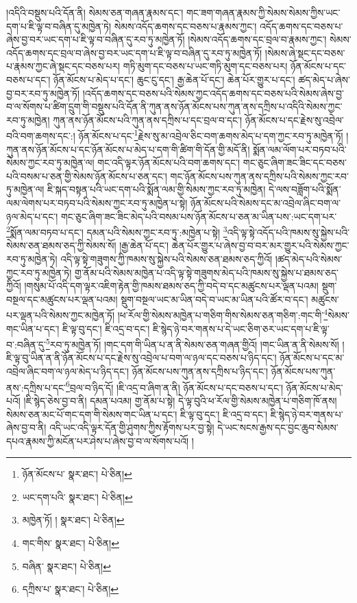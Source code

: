 །འདིའི་བསྡུས་པའི་དོན་ནི། སེམས་ཅན་གཞན་རྣམས་དང་། གང་ཟག་གཞན་རྣམས་ཀྱི་སེམས་སེམས་ཀྱིས་ཡང་དག་པ་ཇི་ལྟ་བ་བཞིན་དུ་མཁྱེན་ཏེ། སེམས་འདོད་ཆགས་དང་བཅས་པ་རྣམས་ཀྱང་། འདོད་ཆགས་དང་བཅས་པ་ཞེས་བྱ་བར་ཡང་དག་པ་ཇི་ལྟ་བ་བཞིན་དུ་རབ་ཏུ་མཁྱེན་ཏོ། །སེམས་འདོད་ཆགས་དང་བྲལ་བ་རྣམས་ཀྱང་། སེམས་འདོད་ཆགས་དང་བྲལ་བ་ཞེས་བྱ་བར་ཡང་དག་པ་ཇི་ལྟ་བ་བཞིན་དུ་རབ་ཏུ་མཁྱེན་ཏོ། །སེམས་ཞེ་སྡང་དང་བཅས་པ་རྣམས་ཀྱང་ཞེ་སྡང་དང་བཅས་པར། གཏི་མུག་དང་བཅས་པ་ཡང་གཏི་མུག་དང་བཅས་པར། ཉོན་མོངས་པ་དང་བཅས་པ་དང་། ཉོན་མོངས་པ་མེད་པ་དང་། ཆུང་ངུ་དང་། རྒྱ་ཆེན་པོ་དང་། ཆེན་པོར་གྱུར་པ་དང་། ཚད་མེད་པ་ཞེས་བྱ་བར་རབ་ཏུ་མཁྱེན་ཏོ། །འདོད་ཆགས་དང་བཅས་པའི་སེམས་ཀྱང་འདོད་ཆགས་དང་བཅས་པའི་སེམས་ཞེས་བྱ་བ་ལ་སོགས་པ་ཚིག་དྲུག་གི་བསྡུས་པའི་དོན་ནི་ཀུན་ནས་ཉོན་མོངས་པས་ཀུན་ནས་དཀྲིས་པ་འདིའི་སེམས་ཀྱང་རབ་ཏུ་མཁྱེན། ཀུན་ནས་ཉོན་མོངས་པའི་ཀུན་ནས་དཀྲིས་པ་དང་བྲལ་བ་དང་། ཉོན་མོངས་པ་དང་རྗེས་སུ་འབྲེལ་བའི་བག་ཆགས་དང་:། ཉོན་མོངས་པ་དང་\footnote{ཉོན་མོངས་པ་  སྣར་ཐང་།  པེ་ཅིན། }རྗེས་སུ་མ་འབྲེལ་ཅིང་བག་ཆགས་མེད་པ་དག་ཀྱང་རབ་ཏུ་མཁྱེན་ཏོ། །ཀུན་ནས་ཉོན་མོངས་པ་དང་ཉོན་མོངས་པ་མེད་པ་དག་གི་ཚིག་གི་དོན་གྱི་མདོ་ནི། སྨོན་ལམ་ལོག་པར་བཏབ་པའི་སེམས་ཀྱང་རབ་ཏུ་མཁྱེན་ལ། གང་འདི་ལྟར་ཉོན་མོངས་པའི་བག་ཆགས་དང་། གང་ཅུང་ཞིག་ཟང་ཟིང་དང་བཅས་པའི་བསམ་པ་ཅན་གྱི་སེམས་ཉོན་མོངས་པ་ཅན་དང་། གང་ཉོན་མོངས་པས་ཀུན་ནས་དཀྲིས་པའི་སེམས་ཀྱང་རབ་ཏུ་མཁྱེན་ལ། ཇི་སྐད་བསྟན་པའི་ཡང་དག་པའི་སྨོན་ལམ་གྱི་སེམས་ཀྱང་རབ་ཏུ་མཁྱེན། དེ་ལས་བཟློག་པའི་སྨོན་ལམ་ལེགས་པར་བཏབ་པའི་སེམས་ཀྱང་རབ་ཏུ་མཁྱེན་པ་སྟེ། ཉོན་མོངས་པའི་སེམས་དང་མ་འབྲེལ་ཞིང་བག་ལ་ཉལ་མེད་པ་དང་། གང་ཅུང་ཞིག་ཟང་ཟིང་མེད་པའི་བསམ་པས་ཉོན་མོངས་པ་ཅན་མ་ཡིན་པས་:ཡང་དག་པར་\footnote{ཡང་དག་པའི་  སྣར་ཐང་།  པེ་ཅིན། }སྨོན་ལམ་བཏབ་པ་དང་། དམན་པའི་སེམས་ཀྱང་རབ་ཏུ་:མཁྱེན་པ་སྟེ། \footnote{མཁྱེན་ཏོ། །   སྣར་ཐང་།  པེ་ཅིན། }འདི་ལྟ་སྟེ་འདོད་པའི་ཁམས་སུ་སྐྱེས་པའི་སེམས་ཅན་ཐམས་ཅད་ཀྱི་སེམས་སོ། །རྒྱ་ཆེན་པོ་དང་། ཆེན་པོར་གྱུར་པ་ཞེས་བྱ་བ་བར་མར་གྱུར་པའི་སེམས་ཀྱང་རབ་ཏུ་མཁྱེན་ཏེ། འདི་ལྟ་སྟེ་གཟུགས་ཀྱི་ཁམས་སུ་སྐྱེས་པའི་སེམས་ཅན་ཐམས་ཅད་ཀྱིའོ། །ཚད་མེད་པའི་སེམས་ཀྱང་རབ་ཏུ་མཁྱེན་ཏེ། གྱ་ནོམ་པའི་སེམས་མཁྱེན་པ་འདི་ལྟ་སྟེ་གཟུགས་མེད་པའི་ཁམས་སུ་སྐྱེས་པ་ཐམས་ཅད་ཀྱིའོ། །གསུམ་པོ་འདི་དག་ལྟར་འཇིག་རྟེན་གྱི་ཁམས་ཐམས་ཅད་ཀྱི་བདེ་བ་དང་མཚུངས་པར་ལྡན་པའམ། སྡུག་བསྔལ་དང་མཚུངས་པར་ལྡན་པའམ། སྡུག་བསྔལ་ཡང་མ་ཡིན་བདེ་བ་ཡང་མ་ཡིན་པའི་ཚོར་བ་དང་། མཚུངས་པར་ལྡན་པའི་སེམས་ཀྱང་མཁྱེན་ཏོ། །ཕ་རོལ་གྱི་སེམས་མཁྱེན་པ་གཅིག་གིས་སེམས་ཅན་གཅིག་:གང་གི་\footnote{གང་གིས་  སྣར་ཐང་།  པེ་ཅིན། }སེམས་གང་ཡིན་པ་དང་། ཇི་ལྟ་བུ་དང་། ཇི་འདྲ་བ་དང་། ཇི་སྙེད་ཉེ་བར་གནས་པ་དེ་ཡང་ཅིག་ཅར་ཡང་དག་པ་ཇི་ལྟ་བ་:བཞིན་དུ་\footnote{བཞིན་  སྣར་ཐང་།  པེ་ཅིན། }རབ་ཏུ་མཁྱེན་ཏོ། །གང་དག་གི་ཡིན་པ་ན་ནི་སེམས་ཅན་གཞན་གྱིའོ། །གང་ཡིན་ན་ནི་སེམས་སོ། །ཇི་ལྟ་བུ་ཡིན་ན་ནི་ཉོན་མོངས་པ་དང་རྗེས་སུ་འབྲེལ་པ་བག་ལ་ཉལ་དང་བཅས་པ་ཉིད་དང་། ཉོན་མོངས་པ་དང་མ་འབྲེལ་ཞིང་བག་ལ་ཉལ་མེད་པ་ཉིད་དང་། ཉོན་མོངས་པས་ཀུན་ནས་དཀྲིས་པ་ཉིད་དང་། ཉོན་མོངས་པས་ཀུན་ནས་:དཀྲིས་པ་དང་\footnote{དཀྲིས་པ་  སྣར་ཐང་།  པེ་ཅིན། }བྲལ་བ་ཉིད་དོ། །ཇི་འདྲ་བ་ཞིག་ན་ནི། ཉོན་མོངས་པ་དང་བཅས་པ་དང་། ཉོན་མོངས་པ་མེད་པའོ། །ཇི་སྙེད་ཅེས་བྱ་བ་ནི། དམན་པའམ། གྱ་ནོམ་པ་སྟེ། དེ་ལྟ་བུའི་ཕ་རོལ་གྱི་སེམས་མཁྱེན་པ་གཅིག་ཁོ་ནས། སེམས་ཅན་མང་པོ་གང་དག་གི་སེམས་གང་ཡིན་པ་དང་། ཇི་ལྟ་བུ་དང་། ཇི་འདྲ་བ་དང་། ཇི་སྙེད་ཉེ་བར་གནས་པ་ཞེས་བྱ་བ་ནི། འདི་ཡང་འདི་ལྟར་དོན་གྱི་ཤུགས་ཀྱིས་རྟོགས་པར་བྱ་སྟེ། དེ་ཡང་སངས་རྒྱས་དང་བྱང་ཆུབ་སེམས་དཔའ་རྣམས་ཀྱི་མངོན་པར་ཤེས་པ་ཞེས་བྱ་བ་ལ་སོགས་པའོ། །

